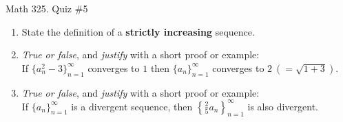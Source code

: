 \documentclass[12pt]{amsart}
\begin{document}
	
	\thispagestyle{empty}
	
	\begin{center}
		\Large{Math 325. Quiz \#5 }\\

	\end{center}
	
	
	
	\bigskip
	
	\begin{enumerate}
	
	\item State the definition of a \textbf{strictly increasing} sequence. 
	
		
	\vfill\vfill
	

\item  \emph{True or false}, and \emph{justify} with a short proof or example:\\
If $\{a_n^2-3\}_{n=1}^\infty$ converges to $1$ then $\{a_n\}_{n=1}^\infty$ converges to $2 \ (= \sqrt{1+3})$.
		
\vfill\vfill\vfill




	\item  \emph{True or false}, and \emph{justify} with a short proof or example:\\
If $\{a_n\}_{n=1}^\infty$ is a divergent sequence, then $\left\{\frac{2}{5} a_n\right\}_{n=1}^\infty$ is also divergent.


\vfill\vfill\vfill 








\end{enumerate}

%
	
	
\end{document}
